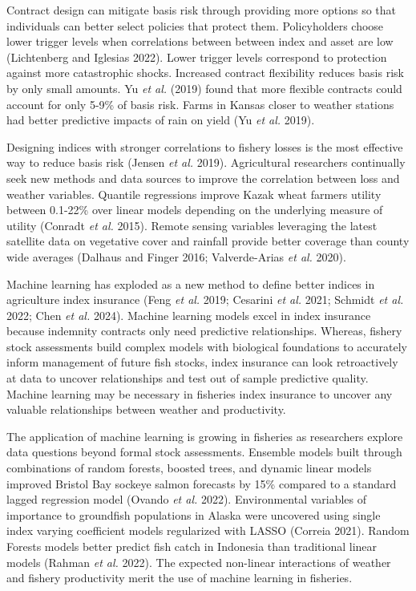 \documentclass[
  letterpaper,
  DIV=11,
  numbers=noendperiod]{scrartcl}
\begin{document}
Contract design can mitigate basis risk through providing more options
so that individuals can better select policies that protect them.
Policyholders choose lower trigger levels when correlations between
between index and asset are low (Lichtenberg and Iglesias 2022). Lower
trigger levels correspond to protection against more catastrophic
shocks. Increased contract flexibility reduces basis risk by only small
amounts. Yu \emph{et al.} (2019) found that more flexible contracts
could account for only 5-9\% of basis risk. Farms in Kansas closer to
weather stations had better predictive impacts of rain on yield (Yu
\emph{et al.} 2019).

Designing indices with stronger correlations to fishery losses is the
most effective way to reduce basis risk (Jensen \emph{et al.} 2019).
Agricultural researchers continually seek new methods and data sources
to improve the correlation between loss and weather variables. Quantile
regressions improve Kazak wheat farmers utility between 0.1-22\% over
linear models depending on the underlying measure of utility (Conradt
\emph{et al.} 2015). Remote sensing variables leveraging the latest
satellite data on vegetative cover and rainfall provide better coverage
than county wide averages (Dalhaus and Finger 2016; Valverde-Arias
\emph{et al.} 2020).

Machine learning has exploded as a new method to define better indices
in agriculture index insurance (Feng \emph{et al.} 2019; Cesarini
\emph{et al.} 2021; Schmidt \emph{et al.} 2022; Chen \emph{et al.}
2024). Machine learning models excel in index insurance because
indemnity contracts only need predictive relationships. Whereas, fishery
stock assessments build complex models with biological foundations to
accurately inform management of future fish stocks, index insurance can
look retroactively at data to uncover relationships and test out of
sample predictive quality. Machine learning may be necessary in
fisheries index insurance to uncover any valuable relationships between
weather and productivity.

The application of machine learning is growing in fisheries as
researchers explore data questions beyond formal stock assessments.
Ensemble models built through combinations of random forests, boosted
trees, and dynamic linear models improved Bristol Bay sockeye salmon
forecasts by 15\% compared to a standard lagged regression model (Ovando
\emph{et al.} 2022). Environmental variables of importance to groundfish
populations in Alaska were uncovered using single index varying
coefficient models regularized with LASSO (Correia 2021). Random Forests
models better predict fish catch in Indonesia than traditional linear
models (Rahman \emph{et al.} 2022). The expected non-linear interactions
of weather and fishery productivity merit the use of machine learning in
fisheries.
\end{document}
